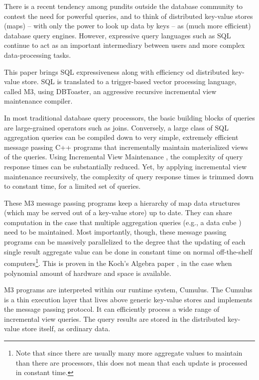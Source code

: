 \documentclass{sig-semester}
\def\M3{M3\xspace}
\begin{document}
There is a recent tendency among pundits outside the database community to contest the need for powerful queries, and to think of distributed key-value stores (maps) -- with only the power to look up data by keys -- as (much more efficient) database query engines. However, expressive query languages such as SQL continue to act as an important intermediary between users and more complex data-processing tasks. 

This paper brings SQL expressiveness along with efficiency od distributed key-value store. SQL is translated to a trigger-based vector processing language, called \M3, using DBToaster\cite{SQLCompiler09}, an aggressive recursive incremental view maintenance compiler. 

In most traditional database query processors, the basic building blocks of queries are large-grained operators such as joins. Conversely, a large class of SQL aggregation queries can be compiled down to very simple, extremely efficient message passing C++ programs that incrementally maintain materialized views of the queries. Using Incremental View Maintenance \cite{Lee01}, the complexity of query response times can be substantially reduced. Yet, by applying incremental view maintenance recursively, the complexity of query response times is trimmed down to constant time, for a limited set of queries.

These \M3 message passing programs keep a hierarchy of map data structures (which may be served out of a key-value store) up to date. They can share computation in the case that multiple aggregation queries (e.g., a data cube \cite{datacube}) need to be maintained.  Most importantly, though, these message passing programs can be massively parallelized to the degree that the updating of each single result aggregate value can be done in constant time on normal off-the-shelf computers\footnote{Note that since there are usually many more aggregate values to maintain than there are processors,
this does not mean that each update is processed in constant time.}. This is proven in the Koch's Algebra paper \cite{KochAlgebra10}, in the case when polynomial amount of hardware and space is available.

\M3 programs are interpreted within our runtime system, Cumulus. The Cumulus is a thin execution layer that lives above generic key-value stores and implements the message passing protocol. It can efficiently process a wide range of incremental view queries. The query results are stored in the distributed key-value store itself, as ordinary data.
\end{document}

